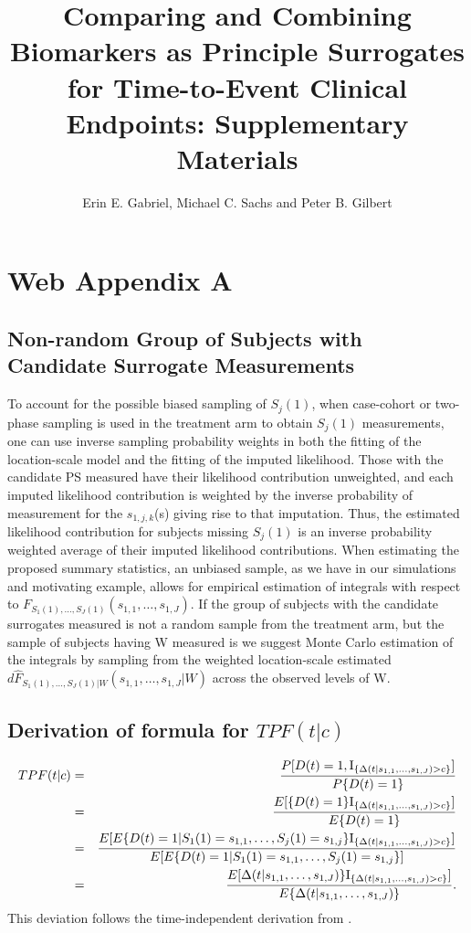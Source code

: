 \documentclass[times, 11pt]{article}
\begin{document}
\author{Erin E. Gabriel, Michael C. Sachs and Peter B. Gilbert}
\title{Comparing and Combining Biomarkers as Principle Surrogates for Time-to-Event Clinical Endpoints: Supplementary Materials}
\maketitle



\section{Web Appendix A}

\subsection{Non-random Group of Subjects with Candidate Surrogate Measurements}
To account for the possible biased sampling of $S_{j}(1)$, when case-cohort or two-phase sampling is used in the treatment arm to obtain $S_j(1)$ measurements, one can use inverse sampling probability weights in both the fitting of the location-scale model and the fitting of the imputed likelihood. Those with the candidate PS measured have their likelihood contribution unweighted, and each imputed likelihood contribution is weighted by the inverse probability of measurement for the $s_{1,j,k}$(s) giving rise to that imputation. Thus, the estimated likelihood contribution for subjects missing $S_{j}(1)$ is an inverse probability weighted average of their imputed likelihood contributions. When estimating the proposed summary statistics, an unbiased sample, as we have in our simulations and motivating example, allows for empirical estimation of integrals with respect to $F_{S_1(1), \ldots, S_J(1)}(s_{1,1}, \dots, s_{1,J})$. If the group of subjects with the candidate surrogates measured is not a random sample from the treatment arm, but the sample of subjects having W measured is we suggest Monte Carlo estimation of the integrals by sampling from the weighted location-scale estimated $d\hat{F}_{S_{1}(1),\ldots,S_{J}(1)|W}(s_{1,1},\ldots,s_{1,J}|W)$ across the observed levels of W. 


\subsection{Derivation of formula for $TPF(t|c)$}
\begin{eqnarray*}
TPF(t|c)&=&P[D(t)=1,\mathrm{I}_{\{\Delta(t|s_{1,1}, \dots, s_{1,J})>c\}}] \over P\{D(t)=1\}\\
&=&E[\{D(t)=1\}\mathrm{I}_{\{\Delta(t|s_{1,1}, \dots, s_{1,J})>c\}}] \over E\{D(t)=1\}\\
&=&{E[E\{D(t)=1|S_{1}(1)=s_{1,1}, \ldots, S_{j}(1)=s_{1,j}\}\mathrm{I}_{\{\Delta(t|s_{1,1}, \dots, s_{1,J})>c\}}] \over E[E\{D(t)=1|S_{1}(1)=s_{1,1}, \ldots, S_{j}(1)=s_{1,j}\}]}\\
&=&{E[\Delta(t|s_{1,1}, \dots, s_{1,J})\}\mathrm{I}_{\{\Delta(t|s_{1,1}, \dots, s_{1,J})>c\}}] \over E\{\Delta(t|s_{1,1}, \dots, s_{1,J})\}}.
\end{eqnarray*}
This deviation follows the time-independent derivation from \citet{Huang12b}.
\end{document}
